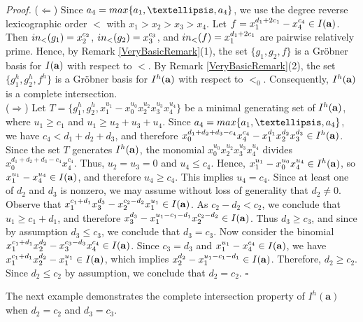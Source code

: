\documentclass[10pt,a4paper]{amsart}
\begin{document}
{\em \noindent Proof.}  ($\Leftarrow$) Since $a_{4}={\rm max}\{a_1,\ldots,a_4\}$, we use the degree reverse lexicographic order $<$ with $x_{1}>x_2>x_3>x_4$. Let $f=x_{1}^{d_1+2c_1}-x_{4}^{c_4} \in I({\bf a})$. Then ${\rm in}_{<}(g_1)=x_{2}^{c_2}$, ${\rm in}_{<}(g_2)=x_{3}^{c_3}$, and ${\rm in}_{<}(f)=x_{1}^{d_{1}+2c_1}$ are pairwise relatively prime. Hence, by Remark \ref{VeryBasicRemark}(1), the set $\{g_1, g_2, f\}$ is a Gr\"obner basis for $I({\bf a})$ with respect to $<$. By Remark \ref{VeryBasicRemark}(2), the set $\{g_{1}^{h}, g_{2}^{h}, f^{h}\}$ is a Gr\"obner basis for $I^{h}({\bf a})$ with respect to $<_{0}$. Consequently, $I^{h}({\bf a})$ is a complete intersection.\\
($\Rightarrow$) Let $T=\{g_{1}^{h}, g_{2}^{h}, x_{1}^{u_1}-x_{0}^{u_{0}}x_{2}^{u_2}x_{3}^{u_3}x_{4}^{u_4}\}$ be a minimal generating set of $I^{h}({\bf a})$, where $u_{1} \geq c_{1}$ and $u_{1} \geq u_2+u_3+u_4$. Since $a_{4}={\rm max}\{a_1,\ldots,a_4\}$, we have $c_{4}<d_{1}+d_{2}+d_{3}$, and therefore $x_{0}^{d_{1}+d_{2}+d_{3}-c_{4}}x_{4}^{c_{4}}-x_{1}^{d_{1}}x_{2}^{d_{2}}x_{3}^{d_{3}} \in I^{h}({\bf a})$. Since the set $T$ generates $I^{h}({\bf a})$, the monomial $x_{0}^{u_{0}}x_{2}^{u_2}x_{3}^{u_3}x_{4}^{u_4}$ divides $x_{0}^{d_{1}+d_{2}+d_{3}-c_{4}}x_{4}^{c_{4}}$. Thus, $u_{2}=u_{3}=0$ and $u_{4} \leq c_{4}$. Hence, $x_{1}^{u_1}-x_{0}^{u_{0}}x_{4}^{u_4} \in I^{h}({\bf a})$, so $x_{1}^{u_1}-x_{4}^{u_4} \in I({\bf a})$, and therefore $u_{4} \geq c_{4}$. This implies $u_{4}=c_{4}$. Since at least one of $d_2$ and $d_3$ is nonzero, we may assume without loss of generality that $d_{2} \neq 0$. Observe that $x_{1}^{c_1+d_1}x_{3}^{d_3}-x_{2}^{c_{2}-d_2}x_{1}^{u_1} \in I({\bf a})$. As $c_2-d_2<c_2$, we conclude that $u_{1} \geq c_1+d_{1}$, and therefore $x_{3}^{d_3}-x_{1}^{u_1-c_1-d_1}x_{2}^{c_2-d_2} \in I({\bf a})$. Thus $d_{3} \geq c_3$, and since by assumption $d_3 \leq c_3$, we conclude that $d_{3}=c_3$. Now consider the binomial $x_{1}^{c_1+d_1}x_{2}^{d_2}-x_{3}^{c_3-d_3}x_{4}^{c_4} \in I({\bf a})$. Since $c_3=d_3$ and $x_{1}^{u_1}-x_{4}^{c_4} \in I({\bf a})$, we have $x_{1}^{c_1+d_1}x_{2}^{d_2}-x_{1}^{u_1} \in I({\bf a})$, which implies $x_{2}^{d_2}-x_{1}^{u_1-c_1-d_1} \in I({\bf a})$. Therefore, $d_2 \geq c_2$. Since $d_2 \leq c_2$ by assumption, we conclude that $d_2=c_2$. \hfill $\square$ \par\vspace{0.5\baselineskip}

The next example demonstrates the complete intersection property of $I^h(\mathbf{a})$ when $d_2=c_2$ and $d_3=c_3$.
\end{document}
